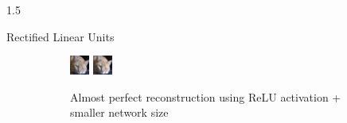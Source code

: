 \documentclass[final]{beamer}
\newlength{\onecolwid}
\newlength{\threecolwid}
\begin{document}
\begin{frame}[t]
\begin{columns}[t]
\begin{column}{\threecolwid}
\begin{columns}[t, totalwidth=\threecolwid]
\begin{column}{1.5\onecolwid}
\begin{block}{Rectified Linear Units}
\begin{figure}
\begin{subfigure}{0.4\linewidth}
			\centering
			\includegraphics[width=0.4\linewidth]{graphics/reconstructions/cifar/relu/input_00_relu.png}
			\includegraphics[width=0.4\linewidth]{graphics/reconstructions/cifar/relu/reconstruction_00_relu.png}

			\caption{Almost perfect reconstruction using ReLU activation + smaller network size}

		\end{subfigure}
		\begin{subfigure}{0.4\linewidth}


\end{subfigure}
\end{figure}
\end{block}
\end{column}
\end{columns}
\end{column}
\end{columns}
\end{frame}
\end{document}
